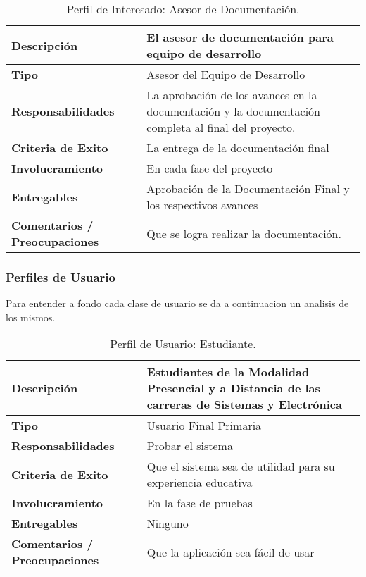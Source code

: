 \pagebreak

\begin{table}[h!]
  \begin{tabular}{|p{}|p{}|}
    \hline
    \textbf{Descripción} & El asesor de documentación para equipo de desarrollo \\
    \hline
    \textbf{Tipo} & Asesor del Equipo de Desarrollo \\
    \hline
    \textbf{Responsabilidades} & La aprobación de los avances en la documentación y la documentación completa al final del proyecto. \\
    \hline
    \textbf{Criteria de Exito} & La entrega de la documentación final \\
    \hline
    \textbf{Involucramiento} & En cada fase del proyecto \\
    \hline
    \textbf{Entregables} & Aprobación de la Documentación Final y los respectivos avances \\
    \hline
    \textbf{Comentarios / Preocupaciones} & Que se logra realizar la documentación. \\
    \hline
  \end{tabular}
  \caption{Perfil de Interesado: Asesor de Documentación.}
  \label{per-inter-a-doc}
\end{table}

\vfill

\subsubsection{Perfiles de Usuario}
Para entender a fondo cada clase de usuario se da a continuacion un analisis de los mismos.

\begin{table}[h!]
  \begin{tabular}{|p{}|p{}|}
    \hline
    \textbf{Descripción} & Estudiantes de la Modalidad Presencial y a Distancia de las carreras de Sistemas y Electrónica \\
    \hline
    \textbf{Tipo} & Usuario Final Primaria \\
    \hline
    \textbf{Responsabilidades} & Probar el sistema \\
    \hline
    \textbf{Criteria de Exito} & Que el sistema sea de utilidad para su experiencia educativa \\
    \hline
    \textbf{Involucramiento} & En la fase de pruebas \\
    \hline
    \textbf{Entregables} & Ninguno \\
    \hline
    \textbf{Comentarios / Preocupaciones} & Que la aplicación sea fácil de usar \\
    \hline
  \end{tabular}
  \caption{Perfil de Usuario: Estudiante.}
  \label{per-user-estu}
\end{table}

